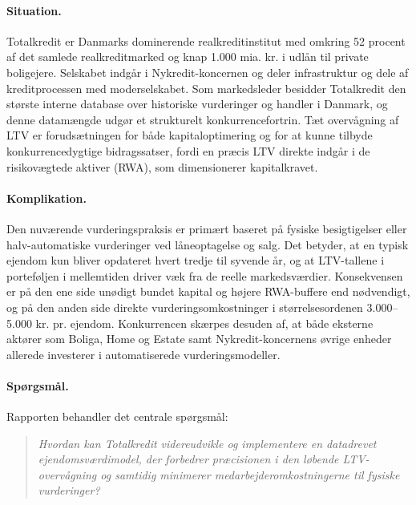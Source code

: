 \documentclass[12pt]{article}
\begin{document}
\paragraph{Situation.}
Totalkredit er Danmarks dominerende realkreditinstitut med omkring 52 procent af det samlede realkreditmarked og knap 1.000 mia. kr. i udlån til private boligejere. Selskabet indgår i Nykredit-koncernen og deler infrastruktur og dele af kreditprocessen med moderselskabet. Som markedsleder besidder Totalkredit den største interne database over historiske vurderinger og handler i Danmark, og denne datamængde udgør et strukturelt konkurrencefortrin. Tæt overvågning af LTV er forudsætningen for både kapitaloptimering og for at kunne tilbyde konkurrencedygtige bidragssatser, fordi en præcis LTV direkte indgår i de risikovægtede aktiver (RWA), som dimensionerer kapitalkravet.

\paragraph{Komplikation.}
Den nuværende vurderingspraksis er primært baseret på fysiske besigtigelser eller halv-automatiske vurderinger ved låneoptagelse og salg. Det betyder, at en typisk ejendom kun bliver opdateret hvert tredje til syvende år, og at LTV-tallene i porteføljen i mellemtiden driver væk fra de reelle markedsværdier. Konsekvensen er på den ene side unødigt bundet kapital og højere RWA-buffere end nødvendigt, og på den anden side direkte vurderingsomkostninger i størrelsesordenen 3.000--5.000 kr. pr. ejendom. Konkurrencen skærpes desuden af, at både eksterne aktører som Boliga, Home og Estate samt Nykredit-koncernens øvrige enheder allerede investerer i automatiserede vurderingsmodeller.

\paragraph{Spørgsmål.}
Rapporten behandler det centrale spørgsmål:
\begin{quote}
\textit{Hvordan kan Totalkredit videreudvikle og implementere en datadrevet ejendomsværdimodel, der forbedrer præcisionen i den løbende LTV-overvågning og samtidig minimerer medarbejderomkostningerne til fysiske vurderinger?}
\end{quote}
\end{document}
